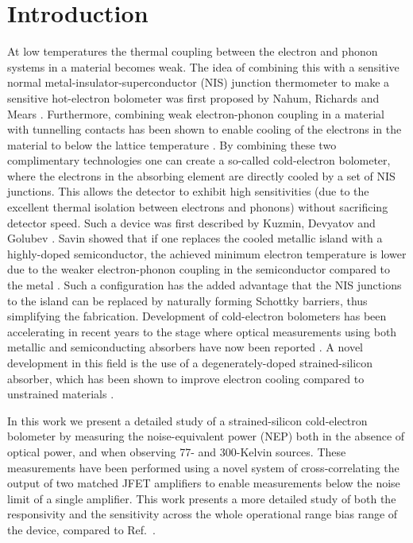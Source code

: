 \documentclass[journal, a4paper]{IEEEtran}
\begin{document}
\section{Introduction}
At low temperatures the thermal coupling between the electron and phonon systems in a material becomes weak. The idea of combining this with a sensitive normal metal-insulator-superconductor (NIS) junction thermometer to make a sensitive hot-electron bolometer was first proposed by Nahum, Richards and Mears \cite{Nahum1993}. Furthermore, combining weak electron-phonon coupling in a material with tunnelling contacts has been shown to enable cooling of the electrons in the material to below the lattice temperature \cite{Nahum1994}. By combining these two complimentary technologies one can create a so-called cold-electron bolometer, where the electrons in the absorbing element are directly cooled by a set of NIS junctions. This allows the detector to exhibit high sensitivities (due to the excellent thermal isolation between electrons and phonons) without sacrificing detector speed. Such a device was first described by Kuzmin, Devyatov and Golubev \cite{Kuzmin1998}. Savin showed that if one replaces the cooled metallic island with a highly-doped semiconductor, the achieved minimum electron temperature is lower due to the weaker electron-phonon coupling in the semiconductor compared to the metal \cite{Savin2001}. Such a configuration has the added advantage that the NIS junctions to the island can be replaced by naturally forming Schottky barriers, thus simplifying the fabrication. Development of cold-electron bolometers has been accelerating in recent years to the stage where optical measurements using both metallic and semiconducting absorbers have now been reported \cite{Tarasov2011,Otto2013,Brien2014}. A novel development in this field is the use of a degenerately-doped strained-silicon
absorber, which has been shown to improve electron cooling compared to unstrained materials \cite{Prest2011}.
\par 
In this work we present a detailed study of a strained-silicon cold-electron bolometer by measuring the noise-equivalent power (NEP) both in the absence of optical power, and when observing 77- and 300-Kelvin sources. These measurements have been performed using a novel system of cross-correlating the output of two matched JFET amplifiers to enable measurements below the noise limit of a single amplifier. This work presents a more detailed study of both the responsivity and the sensitivity across the whole operational range bias range of the device, compared to Ref.~.
\end{document}
